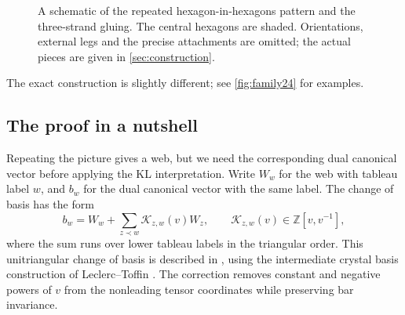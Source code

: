 \documentclass[a4paper,11pt]{amsart}
\newcommand{\Z}{\mathbb Z}
\newcommand{\tpar}{v}
\numberwithin{equation}{subsection}
\theoremstyle{plain}
\theoremstyle{definition}
\theoremstyle{remark}
\begin{document}
\begin{figure}[!ht]
\centering
{}
\caption{A schematic of the repeated hexagon-in-hexagons pattern and
the three-strand gluing. The central hexagons are shaded. Orientations,
external legs and the precise attachments are omitted; the actual
pieces are given in \autoref{sec:construction}.}
\label{fig:intro-hexagons}
\end{figure}

The exact construction is slightly different; see \autoref{fig:family24} for examples.

\subsection{The proof in a nutshell}

Repeating the picture gives a web, but we need the corresponding
dual canonical vector before applying the KL interpretation. Write
$W_w$ for the web with tableau label $w$, and $b_w$ for the dual
canonical vector with the same label. The change of basis has the form
\[
b_w=W_w+\sum_{z\prec w}\mathcal K_{z,w}(\tpar)W_z,\qquad \mathcal K_{z,w}(\tpar)\in\Z[\tpar,\tpar^{-1}],
\]
where the sum runs over lower tableau labels in the triangular order.
This unitriangular change of basis is described in
\cite[Corollary 3.7]{TubbenhauerCrystal}, using the intermediate
crystal basis construction of Leclerc--Toffin \cite{LeclercToffin}.
The correction removes constant and negative powers of $\tpar$ from the
nonleading tensor coordinates while preserving bar invariance.
\end{document}
